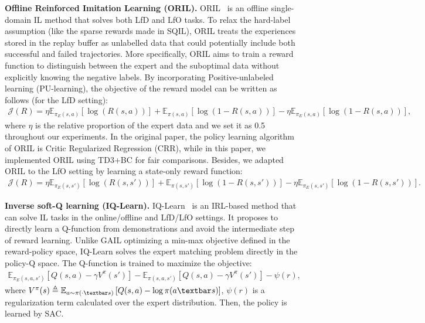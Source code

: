 \textbf{Offline Reinforced Imitation Learning (ORIL).} 
ORIL~\citep{zolna2020offline} is an offline single-domain IL method that solves both LfD and LfO tasks. To relax the hard-label assumption (like the sparse rewards made in SQIL), ORIL treats the experiences stored in the replay buffer as unlabelled data that could potentially include both successful and failed trajectories. 
More specifically, ORIL aims to train a reward function to distinguish between the expert and the suboptimal data without explicitly knowing the negative labels. 
By incorporating Positive-unlabeled learning (PU-learning), the objective of the reward model can be written as follows (for the LfD setting):
\begin{align}
\mathcal{J}(R)= 
\eta\mathbb{E}_{\pi_E(s,a)} \left[ \log(R(s,a)) \right]
+ \mathbb{E}_{\pi(s,a)} \left[ \log(1-R(s,a)) \right]
- \eta\mathbb{E}_{\pi_E(s,a)} \left[ \log(1-R(s,a)) \right], \nonumber
\end{align}
where $\eta$ is the relative proportion of the expert data and we set it as 0.5 throughout our experiments. In the original paper, the policy learning algorithm of ORIL is Critic Regularized Regression (CRR), while in this paper, we implemented ORIL using TD3+BC for fair comparisons. Besides, we adapted ORIL to the LfO setting by learning a state-only reward function:
\begin{align}
\mathcal{J}(R)= 
\eta\mathbb{E}_{\pi_E(s,s')} \left[ \log(R(s,s')) \right]
+ \mathbb{E}_{\pi(s,s')} \left[ \log(1-R(s,s')) \right]
- \eta\mathbb{E}_{\pi_E(s,s')} \left[ \log(1-R(s,s')) \right]. \nonumber
\end{align}

\textbf{Inverse soft-Q learning (IQ-Learn).} 
IQ-Learn~\citep{garg2021iq} is an IRL-based method that can solve IL tasks in the online/offline and LfD/LfO settings. 
It proposes to directly learn a Q-function from demonstrations and avoid the intermediate step of reward learning. 
Unlike GAIL optimizing a min-max objective defined in the reward-policy space, IQ-Learn solves the expert matching problem directly in the policy-Q space. The Q-function is trained to maximize the objective:
\begin{align}
\mathbb{E}_{\pi_E(s,a,s')}\left[Q(s,a)- \gamma V^{\pi}(s') \right] 
- \mathbb{E}_{\pi(s,a,s')}\left[Q(s,a)- \gamma V^{\pi}(s') \right]
-\psi(r), \nonumber
\end{align}
where $V^\pi(s) \triangleq \mathbb{E}_{a \sim \pi(\cdot \textbar s)} \left[ Q(s,a) - \log \pi(a\textbar s) \right] $, $\psi(r) $ is a regularization term calculated over the expert distribution. Then, the policy is learned by SAC.

